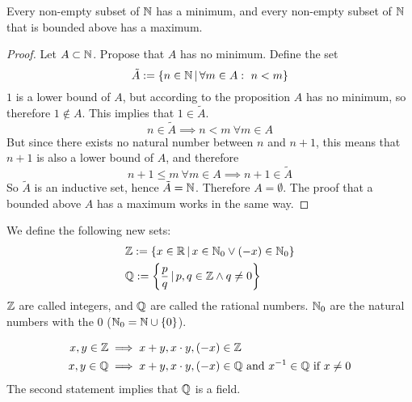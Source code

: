 \documentclass[../../script.tex]{subfiles}
\begin{document}
\begin{cor}\label{cor:minimum}
Every non-empty subset of $\mathbb{N}$ has a minimum, and every non-empty subset of $\mathbb{N}$ that is bounded above has a maximum.
\end{cor}
\begin{proof}
Let $A \subset \mathbb{N}$. Propose that $A$ has no minimum. Define the set
\begin{equation}
	\tilde{A} := \{n \in \mathbb{N} \,\vert\, \forall m \in A: ~n < m\}
\end{equation}
$1$ is a lower bound of $A$, but according to the proposition $A$ has no minimum, so therefore $1 \notin A$. This implies that $1 \in \tilde{A}$. 
\begin{equation}
	n \in \tilde{A} \implies n < m ~\forall m \in A
\end{equation}
But since there exists no natural number between $n$ and $n+1$, this means that $n+1$ is also a lower bound of $A$, and therefore
\begin{equation}
	n+1 \le m ~\forall m \in A \implies n+1 \in \tilde{A}
\end{equation}
So $\tilde{A}$ is an inductive set, hence $\tilde{A} = \mathbb{N}$. Therefore $A = \emptyset$.
The proof that a bounded above $A$ has a maximum works in the same way.
\end{proof}

\begin{defi}
We define the following new sets:
\begin{align*}
	&\mathbb{Z} := \{x \in \mathbb{R} \,\vert\, x \in \mathbb{N}_0 \vee (-x) \in \mathbb{N}_0\}\\
	&\mathbb{Q} := \left\{\frac{p}{q} \,\vert\, p, q \in \mathbb{Z} \wedge q \ne 0\right\}
\end{align*}
$\mathbb{Z}$ are called integers, and $\mathbb{Q}$ are called the rational numbers. $\mathbb{N}_0$ are the natural numbers with the $0$ ($\mathbb{N}_0 = \mathbb{N} \cup \{0\}$).
\end{defi}

\begin{rem}
\begin{align*}
	x, y \in \mathbb{Z} &\implies x+y, x\cdot y, (-x) \in \mathbb{Z} \\
	x, y \in \mathbb{Q} &\implies x+y, x\cdot y, (-x) \in \mathbb{Q} \text{ and } {x}^{-1} \in \mathbb{Q} \text{ if } x \ne 0
\end{align*}
The second statement implies that $\mathbb{Q}$ is a field.
\end{rem}
\end{document}
